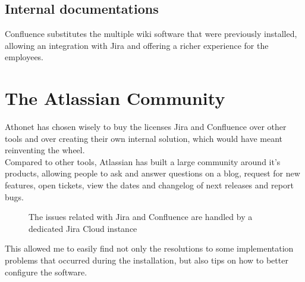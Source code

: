 	\subsection{Internal documentations}
		Confluence substitutes the multiple wiki software that were previously installed, allowing an integration with Jira and offering a richer experience for the employees.
	
\section{The Atlassian Community}\label{sec:atlassian_community}
	Athonet has chosen wisely to buy the licenses Jira and Confluence over other tools and over creating their own internal solution, which would have meant reinventing the wheel.\\
	Compared to other tools, Atlassian has built a large community around it's products, allowing people to ask and answer questions on a blog, request for new features, open tickets, view the dates and changelog of next releases and report bugs.
	\begin{figure}[H]
		\centering
		\caption{The issues related with Jira and Confluence are handled by a dedicated Jira Cloud instance}
	\end{figure}
	This allowed me to easily find not only the resolutions to some implementation problems that occurred during the installation, but also tips on how to better configure the software.

